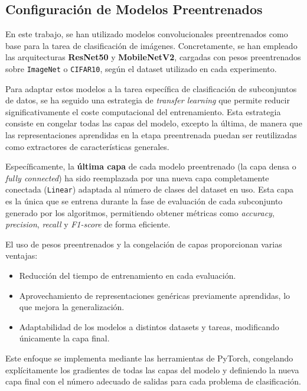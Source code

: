 \subsection{Configuración de Modelos Preentrenados}\label{subsec:configuracion-modelos-preentrenados}
En este trabajo, se han utilizado modelos convolucionales preentrenados como base para la tarea de clasificación de imágenes.
Concretamente, se han empleado las arquitecturas \textbf{ResNet50} y \textbf{MobileNetV2},
cargadas con pesos preentrenados sobre \texttt{ImageNet} o \texttt{CIFAR10}, según el dataset utilizado en cada experimento.

Para adaptar estos modelos a la tarea específica de clasificación de subconjuntos de datos,
se ha seguido una estrategia de \textit{transfer learning} que permite reducir significativamente el coste computacional del entrenamiento.
Esta estrategia consiste en congelar todas las capas del modelo, excepto la última,
de manera que las representaciones aprendidas en la etapa preentrenada puedan ser reutilizadas como extractores de características generales.

Específicamente, la \textbf{última capa} de cada modelo preentrenado (la capa densa o \textit{fully connected})
ha sido reemplazada por una nueva capa completamente conectada (\texttt{Linear}) adaptada al número de clases del dataset en uso.
Esta capa es la única que se entrena durante la fase de evaluación de cada subconjunto generado por los algoritmos,
permitiendo obtener métricas como \textit{accuracy}, \textit{precision}, \textit{recall} y \textit{F1-score} de forma eficiente.

El uso de pesos preentrenados y la congelación de capas proporcionan varias ventajas:
\begin{itemize}
      \item Reducción del tiempo de entrenamiento en cada evaluación.
      \item Aprovechamiento de representaciones genéricas previamente aprendidas, lo que mejora la generalización.
      \item Adaptabilidad de los modelos a distintos datasets y tareas, modificando únicamente la capa final.
\end{itemize}

Este enfoque se implementa mediante las herramientas de PyTorch,
congelando explícitamente los gradientes de todas las capas del modelo y definiendo la nueva capa final con el número adecuado de salidas para cada problema de clasificación.


